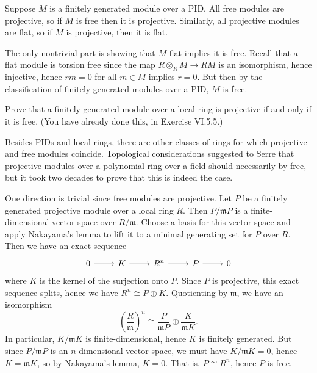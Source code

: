 \documentclass[../../master.tex]{subfiles}
\begin{document}
\begin{solution}
    Suppose $M$ is a finitely generated module over a PID.
    All free modules are projective, so if $M$ is free then it is projective.
    Similarly, all projective modules are flat, so if $M$ is projective, then it is flat.

    The only nontrivial part is showing that $M$ flat implies it is free.
    Recall that a flat module is torsion free since the map $R \otimes_R M \to RM$ is an isomorphism, hence injective, hence $rm = 0$ for all $m \in M$ implies $r = 0$.
    But then by the classification of finitely generated modules over a PID, $M$ is free.
\end{solution}

\begin{problem}
    Prove that a finitely generated module over a local ring is projective if and only if it is free.
    (You have already done this, in Exercise VI.5.5.)

    Besides PIDs and local rings, there are other classes of rings for which projective and free modules coincide.
    Topological considerations suggested to Serre that projective modules over a polynomial ring over a field should necessarily by free, but it took two decades to prove that this is indeed the case.
\end{problem}

\begin{solution}
    One direction is trivial since free modules are projective.
    Let $P$ be a finitely generated projective module over a local ring $R$.
    Then $P/\mathfrak{m}P$ is a finite-dimensional vector space over $R/\mathfrak{m}$.
    Choose a basis for this vector space and apply Nakayama's lemma to lift it to a minimal generating set for $P$ over $R$.
    Then we have an exact sequence
    \[
    \begin{tikzcd}
        0 & K & R^{n} & P & 0
        \arrow[from=1-1, to=1-2]
        \arrow[from=1-2, to=1-3] 
        \arrow[from=1-3, to=1-4]
        \arrow[from=1-4, to=1-5] 
    \end{tikzcd}
    \]
    where $K$ is the kernel of the surjection onto $P$.
    Since $P$ is projective, this exact sequence splits, hence we have $R^{n} \cong P \oplus K$.
    Quotienting by $\mathfrak{m}$, we have an isomorphism
    \[
        \left(\frac{R}{\mathfrak{m}}\right)^{n} \cong \frac{P}{\mathfrak{m}P} \oplus \frac{K}{\mathfrak{m}K}.
    \]
    In particular, $K/\mathfrak{m}K$ is finite-dimensional, hence $K$ is finitely generated.
    But since $P/\mathfrak{m}P$ is an $n$-dimensional vector space, we must have $K/\mathfrak{m}K = 0$, hence $K = \mathfrak{m}K$, so by Nakayama's lemma, $K = 0$.
    That is, $P \cong R^{n}$, hence $P$ is free.
\end{solution}
\end{document}
